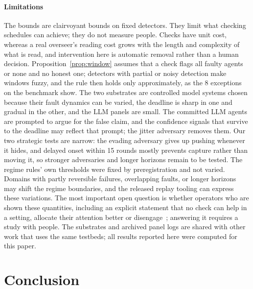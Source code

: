 \documentclass[pdflatex,sn-mathphys-num]{sn-jnl}
\theoremstyle{thmstyleone}%
\begin{document}
\paragraph{Limitations}
The bounds are clairvoyant bounds on fixed detectors. They limit what checking schedules can achieve; they do not measure people. Checks have unit cost, whereas a real overseer's reading cost grows with the length and complexity of what is read, and intervention here is automatic removal rather than a human decision. Proposition~\ref{prop:window} assumes that a check flags all faulty agents or none and no honest one; detectors with partial or noisy detection make windows fuzzy, and the rule then holds only approximately, as the 8 exceptions on the benchmark show. The two substrates are controlled model systems chosen because their fault dynamics can be varied, the deadline is sharp in one and gradual in the other, and the LLM panels are small. The committed LLM agents are prompted to argue for the false claim, and the confidence signals that survive to the deadline may reflect that prompt; the jitter adversary removes them. Our two strategic tests are narrow: the evading adversary gives up pushing whenever it hides, and delayed onset within 15 rounds mostly prevents capture rather than moving it, so stronger adversaries and longer horizons remain to be tested. The regime rules' own thresholds were fixed by preregistration and not varied. Domains with partly reversible failures, overlapping faults, or longer horizons may shift the regime boundaries, and the released replay tooling can express these variations. The most important open question is whether operators who are shown these quantities, including an explicit statement that no check can help in a setting, allocate their attention better or disengage~\cite{parasuraman1997,lee2004trust}; answering it requires a study with people. The substrates and archived panel logs are shared with other work that uses the same testbeds; all results reported here were computed for this paper.

\section{Conclusion}
\end{document}
